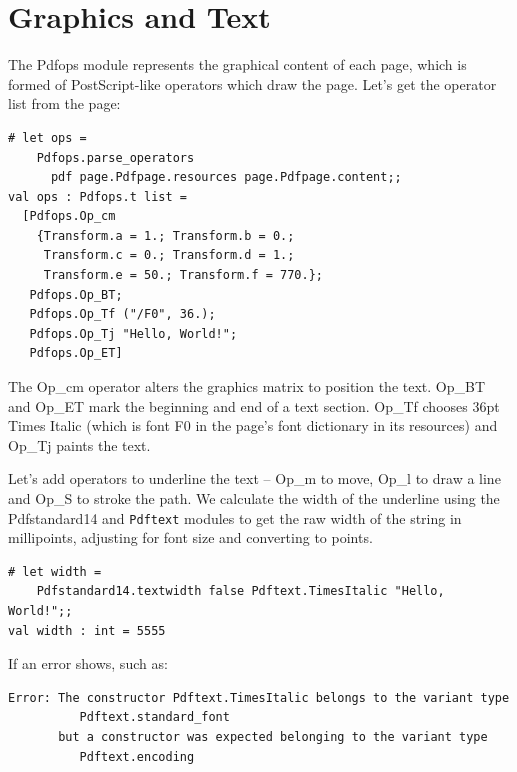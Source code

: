 \documentclass[a4paper]{memoir}
\begin{document}
\section*{Graphics and Text}
The \textsf{Pdfops} module represents the graphical content of each page, which is formed of PostScript-like operators which draw the page. Let's get the operator list from the page:

\begin{framed}
\small\begin{verbatim}
# let ops =
    Pdfops.parse_operators
      pdf page.Pdfpage.resources page.Pdfpage.content;;
val ops : Pdfops.t list =
  [Pdfops.Op_cm
    {Transform.a = 1.; Transform.b = 0.;
     Transform.c = 0.; Transform.d = 1.;
     Transform.e = 50.; Transform.f = 770.};
   Pdfops.Op_BT;
   Pdfops.Op_Tf ("/F0", 36.);
   Pdfops.Op_Tj "Hello, World!";
   Pdfops.Op_ET]
\end{verbatim}
\end{framed}
\noindent The \textsf{Op\_cm} operator alters the graphics matrix to position the text. \textsf{Op\_BT} and \textsf{Op\_ET} mark the beginning and end of a text section. \textsf{Op\_Tf} chooses 36pt Times Italic (which is font \textsf{F0} in the page's font dictionary in its resources) and \textsf{Op\_Tj} paints the text.

Let's add operators to underline the text -- \textsf{Op\_m} to move, \textsf{Op\_l} to draw a line and \textsf{Op\_S} to stroke the path. We calculate the width of the underline using the \textsf{Pdfstandard14} and \texttt{Pdftext} modules to get the raw width of the string in millipoints, adjusting for font size and converting to points.

\begin{framed}
\small\begin{verbatim}
# let width =
    Pdfstandard14.textwidth false Pdftext.TimesItalic "Hello, World!";;
val width : int = 5555
\end{verbatim}
\end{framed}

\clearpage

\noindent If an error shows, such as:

\begin{framed}
\small\begin{verbatim}
Error: The constructor Pdftext.TimesItalic belongs to the variant type
          Pdftext.standard_font
       but a constructor was expected belonging to the variant type
          Pdftext.encoding
\end{verbatim}
\end{framed}
\end{document}
